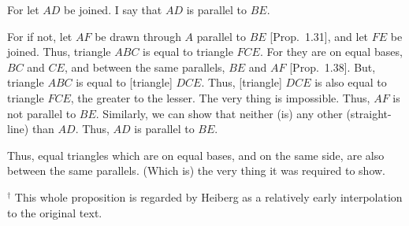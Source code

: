 \begin{Parallel}{}{}
{\epsfysize=1.5in
\centerline{}

For let $AD$ be joined. I say that $AD$ is parallel to $BE$.

For if not, let $AF$ be drawn through $A$ parallel to $BE$ [Prop.~1.31],
and let $FE$ be joined. Thus, triangle $ABC$ is equal to triangle
$FCE$. For they are on equal bases, $BC$ and $CE$, and between the same
parallels, $BE$ and $AF$ [Prop.~1.38]. But, triangle $ABC$ is equal to [triangle] $DCE$.
Thus, [triangle] $DCE$ is also equal to triangle $FCE$, the greater to the
lesser. The very thing is impossible. 
Thus, $AF$ is not parallel to $BE$. Similarly, we can show that neither (is)
any other (straight-line) than $AD$. Thus, $AD$ is parallel to $BE$.

Thus, equal triangles which are on equal bases, and on the same side, are also
between the same parallels. (Which is) the very thing it was required to show.}
\end{Parallel}
{\footnotesize \noindent$^\dag$ This whole proposition is regarded by
Heiberg as a relatively early interpolation to the original text.\\}

